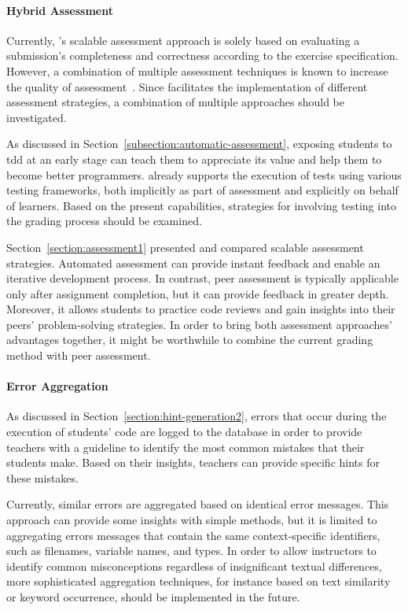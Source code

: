 \paragraph{Hybrid Assessment}

Currently, \tool's scalable assessment approach is solely based on evaluating a submission's completeness and correctness according to the exercise specification. However, a combination of multiple assessment techniques is known to increase the quality of assessment~\cite{pieterse2013automated}. Since \tool facilitates the implementation of different assessment strategies, a combination of multiple approaches should be investigated.

As discussed in Section~\ref{subsection:automatic-assessment}, exposing students to \gls{tdd} at an early stage can teach them to appreciate its value and help them to become better programmers. \tool already supports the execution of tests using various testing frameworks, both implicitly as part of assessment and explicitly on behalf of learners. Based on the present capabilities, strategies for involving testing into the grading process should be examined.

Section~\ref{section:assessment1} presented and compared scalable assessment strategies. Automated assessment can provide instant feedback and enable an iterative development process. In contrast, peer assessment is typically applicable only after assignment completion, but it can provide feedback in greater depth. Moreover, it allows students to practice code reviews and gain insights into their peers' problem-solving strategies. In order to bring both assessment approaches' advantages together, it might be worthwhile to combine the current grading method with peer assessment.

\paragraph{Error Aggregation}

As discussed in Section~\ref{section:hint-generation2}, errors that occur during the execution of students' code are logged to the database in order to provide teachers with a guideline to identify the most common mistakes that their students make. Based on their insights, teachers can provide specific hints for these mistakes.

Currently, similar errors are aggregated based on identical error messages. This approach can provide some insights with simple methods, but it is limited to aggregating errors messages that contain the same context-specific identifiers, such as filenames, variable names, and types. In order to allow instructors to identify common misconceptions regardless of insignificant textual differences, more sophisticated aggregation techniques, for instance based on text similarity or keyword occurrence, should be implemented in the future.
